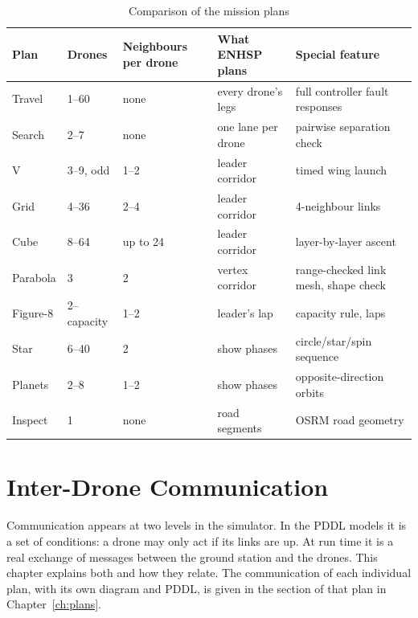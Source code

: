 \documentclass[11pt,a4paper,oneside]{report}
\newcommand{\maxTravel}{60}
\newcommand{\maxSearch}{7}
\newcommand{\maxV}{9}
\newcommand{\maxGrid}{36}
\newcommand{\maxCube}{64}
\newcommand{\maxStar}{40}
\newcommand{\maxPlanets}{8}
\begin{document}
\begin{table}[H]
\caption{Comparison of the mission plans}\label{tab:plansummary}
\small
\begin{tabularx}{\textwidth}{@{}lP{0.13\textwidth}P{0.13\textwidth}P{0.17\textwidth}Y@{}}
\toprule
\textbf{Plan} & \textbf{Drones} & \textbf{Neighbours per drone} & \textbf{What ENHSP plans} & \textbf{Special feature} \\
\midrule
Travel     & 1--\maxTravel & none & every drone's legs & full controller fault responses \\
Search     & 2--\maxSearch & none & one lane per drone & pairwise separation check \\
V          & 3--\maxV, odd & 1--2 & leader corridor & timed wing launch \\
Grid       & 4--\maxGrid & 2--4 & leader corridor & 4-neighbour links \\
Cube       & 8--\maxCube & up to 24 & leader corridor & layer-by-layer ascent \\
Parabola   & 3 & 2 & vertex corridor & range-checked link mesh, shape check \\
Figure-8   & 2--capacity & 1--2 & leader's lap & capacity rule, laps \\
Star       & 6--\maxStar & 2 & show phases & circle/star/spin sequence \\
Planets    & 2--\maxPlanets & 1--2 & show phases & opposite-direction orbits \\
Inspect    & 1 & none & road segments & OSRM road geometry \\
\bottomrule
\end{tabularx}
\end{table}

\chapter{Inter-Drone Communication}\label{ch:comm}
Communication appears at two levels in the simulator. In the PDDL models it is a set of
conditions: a drone may only act if its links are up. At run time it is a real exchange of
messages between the ground station and the drones. This chapter explains both and how they
relate. The communication of each individual plan, with its own diagram and PDDL, is given in
the section of that plan in Chapter~\ref{ch:plans}.
\end{document}

